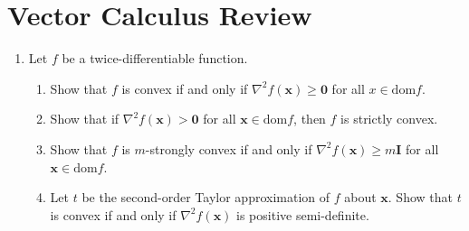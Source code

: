 \documentclass{article}
\begin{document}
\section{Vector Calculus Review}
\begin{enumerate}[label=\arabic*.]
\item Let $f$ be a twice-differentiable function.
\begin{enumerate}[label=(\alph*)]
\item Show that $f$ is convex if and only if $\nabla^2 f(\mathbf{x}) \geq \mathbf{0}$ for all $x \in \text{dom} f$.
\item Show that if $\nabla^2 f(\mathbf{x}) > \mathbf{0}$ for all $\mathbf{x} \in \text{dom} f$, then $f$ is strictly convex.
\item Show that $f$ is $m$-strongly convex if and only if $\nabla^2 f(\mathbf{x}) \geq m\mathbf{I}$ for all $\mathbf{x} \in \text{dom} f$.
\item Let $t$ be the second-order Taylor approximation of $f$ about $\mathbf{x}$. Show that $t$ is convex if and only if $\nabla^2 f(\mathbf{x})$ is positive semi-definite.
\end{enumerate}
\end{enumerate}
\end{document}
